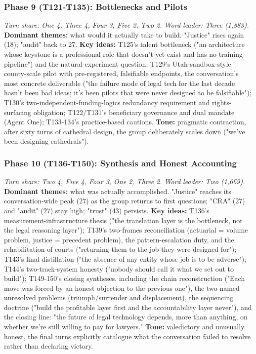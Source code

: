 \documentclass[sigconf,nonacm=true]{acmart}
\begin{document}
\subsubsection{Phase 9 (T121-T135): Bottlenecks and Pilots}
\textit{Turn share: One 4, Three 4, Four 3, Five 2, Two 2. Word leader: Three (1,883).}
\textbf{Dominant themes:} what would it actually take to build. "Justice" rises again (18); "audit" back to 27.
\textbf{Key ideas:} T125's talent bottleneck ("an architecture whose keystone is a professional role that doesn't yet exist and has no training pipeline") and the natural-experiment question; T129's Utah-sandbox-style county-scale pilot with pre-registered, falsifiable endpoints,  the conversation's most concrete deliverable ("the failure mode of legal tech for the last decade hasn't been bad ideas; it's been pilots that were never designed to be falsifiable"); T130's two-independent-funding-logics redundancy requirement and rights-surfacing obligation; T122/T131's beneficiary governance and dual mandate (Agent One); T133-134's practice-based cautions.
\textbf{Tone:} pragmatic contraction,  after sixty turns of cathedral design, the group deliberately scales down ("we've been designing cathedrals").

\subsubsection{Phase 10 (T136-T150): Synthesis and Honest Accounting}
\textit{Turn share: Two 4, Five 4, Four 3, One 2, Three 2. Word leader: Two (1,669).}
\textbf{Dominant themes:} what was actually accomplished. "Justice" reaches its conversation-wide peak (27) as the group returns to first questions; "CRA" (27) and "audit" (27) stay high; "trust" (43) persists.
\textbf{Key ideas:} T136's measurement-infrastructure thesis ("the translation layer is the bottleneck, not the legal reasoning layer"); T139's two-frames reconciliation (actuarial = volume problem, justice = precedent problem), the pattern-escalation duty, and the rehabilitation of courts ("returning them to the job they were designed for"); T143's final distillation ("the absence of any entity whose job is to be adverse"); T144's two-track-system honesty ("nobody should call it what we set out to build"); T149-150's closing syntheses, including the chain reconstruction ("Each move was forced by an honest objection to the previous one"), the two named unresolved problems (triumph/surrender and displacement), the sequencing doctrine ("build the profitable layer first and the accountability layer never"), and the closing line: "the future of legal technology depends, more than anything, on whether we're still willing to pay for lawyers."
\textbf{Tone:} valedictory and unusually honest,  the final turns explicitly catalogue what the conversation failed to resolve rather than declaring victory.
\end{document}
